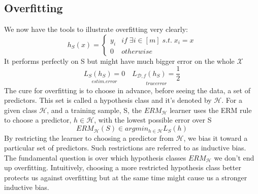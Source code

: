 \subsection{Overfitting}
We now have the tools to illustrate overfitting very clearly:
\[ 
    h_S(x) = \begin{cases}
        y_i & if\; \exists i \in [m]\; s.t. \; x_i = x\\
        0 & otherwise
    \end{cases} 
\]It performs perfectly on S but might have much bigger error on the whole $\mathcal{X}$
\[ 
    \underset{estim. error}{L_S(h_S) = 0} \quad \underset{true error}{L_{\mathcal{D},f}(h_S)= \frac{1}{2}} 
\]
The cure for overfitting is to choose in advance, before seeing the data, a set of predictors. This set is called a hypothesis class and it's denoted by $\mathcal{H}$. For a given class $\mathcal{H}$, and a training sample, S, the $ERM_\mathcal{H}$ learner uses the ERM rule to choose a predictor, $h \in \mathcal{H}$, with the lowest possible error over S
\[ 
    ERM_\mathcal{H}(S) \in argmin_{h \in \mathcal{H}}{L_S(h)} 
\]
By restricting the learner to choosing a predictor from $\mathcal{H}$, we bias it toward a particular set of predictors. Such restrictions are referred to as inductive bias. 
The fundamental question is over which hypothesis classes $ERM_\mathcal{H}$ we don't end up overfitting. Intuitively, choosing a more restricted hypothesis class better protects us against overfitting but at the same time might cause us a stronger inductive bias. 
